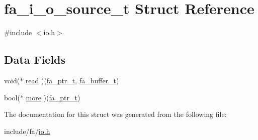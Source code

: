 \hypertarget{structfa__i__o__source__t}{\section{fa\-\_\-i\-\_\-o\-\_\-source\-\_\-t Struct Reference}
\label{structfa__i__o__source__t}
}


{\ttfamily \#include $<$io.\-h$>$}

\subsection*{Data Fields}
\begin{DoxyCompactItemize}
\item 
void($\ast$ \hyperlink{group___fa_gadb3be2e2327493b2e1eae4dc73d9ab8c}{read} )(\hyperlink{group___fa_ga915ddeae99ad7568b273d2b876425197}{fa\-\_\-ptr\-\_\-t}, \hyperlink{group___fa_buffer_ga0ed7a1d783ab322e2e8be02432d0839e}{fa\-\_\-buffer\-\_\-t})
\item 
bool($\ast$ \hyperlink{group___fa_gacf426a15915245589d75f038debd6b20}{more} )(\hyperlink{group___fa_ga915ddeae99ad7568b273d2b876425197}{fa\-\_\-ptr\-\_\-t})
\end{DoxyCompactItemize}


The documentation for this struct was generated from the following file\-:\begin{DoxyCompactItemize}
\item 
include/fa/\hyperlink{io_8h}{io.\-h}\end{DoxyCompactItemize}
